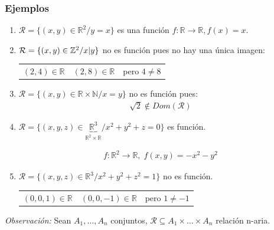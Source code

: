 \subsubsection{Ejemplos}
\begin{enumerate}
    \item $\mathcal{R} = \{(x,y) \in \mathbb{R}^2 / y = x\}$ es una función 
        $f: \mathbb{R} \to \mathbb{R}, f(x) = x$. 

    \item $\mathcal{R} = \{ (x,y) \in \mathbb{Z}^2 / \divides{x}{y} \}$ no es
        función pues no hay una única imagen:

        \begin{center}
          \begin{tabular}{c c c}
              $(2,4) \in \mathbb{R}$ & $(2,8) \in \mathbb{R}$ & pero $4 \neq 8$
          \end{tabular}
        \end{center}
    \item $\mathcal{R} = \{ (x,y) \in \mathbb{R} \times \mathbb{N} / x = y\}$
        no es función pues: 
        \begin{gather*}
            \sqrt{2} \notin Dom(\mathcal{R})
        \end{gather*}

    \item $\mathcal{R} = \{(x,y,z) \in 
        \underbrace{\mathbb{R}^3}_{\mathbb{R}^2 \times \mathbb{R}} / 
        x^2 + y^2 + z = 0\}$ es función.
        
        \begin{gather*}
            f: \mathbb{R}^2 \to \mathbb{R}, \; f(x,y) = -x^2 - y^2
        \end{gather*}

    \item $\mathcal{R} = \{ (x,y,z) \in \mathbb{R}^3 / x^2 + y^2 + z^2 = 1 \}$
        no es función.

        \begin{center}
            \begin{tabular}{c c c}
                $(0,0,1) \in \mathbb{R}$ & $(0,0,-1) \in \mathbb{R}$ & 
                pero $1 \neq -1$
            \end{tabular}
        \end{center}
\end{enumerate}

\bigskip
\textit{Observación:} 
Sean $A_1, \dotsc, A_n$ conjuntos, 
$\mathcal{R} \subseteq A_1 \times \dots \times A_n$ relación n-aria.

